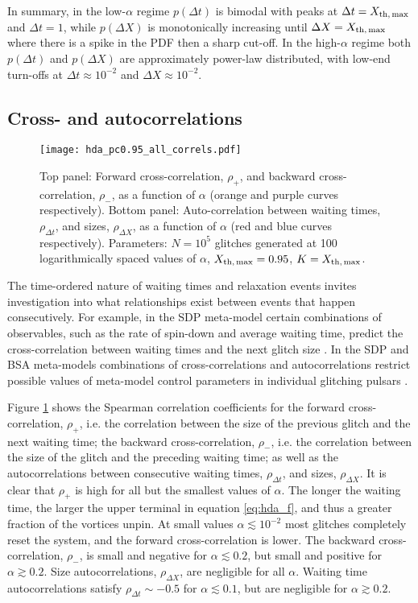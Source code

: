 In summary, in the low-$\alpha$ regime $p(\Delta t)$ is bimodal with peaks at $\Delta t = X_{\rm th,\,max}$ and $\Delta t = 1$, while $p(\Delta X)$ is monotonically increasing until $\Delta X = X_{\rm th,\,max}$ where there is a spike in the PDF then a sharp cut-off. In the high-$\alpha$ regime both $p(\Delta t)$ and $p(\Delta X)$ are approximately power-law distributed, with low-end turn-offs at $\Delta t \approx 10^{-2}$ and $\Delta X \approx 10^{-2}$.

\subsection{Cross- and autocorrelations}
\begin{figure}
\centering
\texttt{[image: hda\_pc0.95\_all\_correls.pdf]}
\caption{Top panel: Forward cross-correlation, $\rho_+$, and backward cross-correlation, $\rho_-$, as a function of $\alpha$ (orange and purple curves respectively). Bottom panel: Auto-correlation between waiting times, $\rho_{\Delta t}$, and sizes, $\rho_{\Delta X}$, as a function of $\alpha$ (red and blue curves respectively). Parameters: $N=10^5$ glitches generated at 100 logarithmically spaced values of $\alpha$, $X_{\rm th,\,max}=0.95$, $K=X_{\rm th,\,max}$. \label{fig:hda_all_correl}}
\end{figure}

The time-ordered nature of waiting times and relaxation events invites investigation into what relationships exist between events that happen consecutively. For example, in the SDP meta-model certain combinations of observables, such as the rate of spin-down and average waiting time, predict the cross-correlation between waiting times and the next glitch size \citep{Melatos2018}. In the SDP and BSA meta-models combinations of cross-correlations and autocorrelations restrict possible values of meta-model control parameters in individual glitching pulsars \citep{Carlin2019ac, Carlin2020bsa}. 

Figure \ref{fig:hda_all_correl} shows the Spearman correlation coefficients for the forward cross-correlation, $\rho_+$, i.e. the correlation between the size of the previous glitch and the next waiting time; the backward cross-correlation, $\rho_-$, i.e. the correlation between the size of the glitch and the preceding waiting time; as well as the autocorrelations between consecutive waiting times, $\rho_{\Delta t}$, and sizes, $\rho_{\Delta X}$. It is clear that $\rho_+$ is high for all but the smallest values of $\alpha$. The longer the waiting time, the larger the upper terminal in equation \eqref{eq:hda_f}, and thus a greater fraction of the vortices unpin. At small values $\alpha \lesssim 10^{-2}$ most glitches completely reset the system, and the forward cross-correlation is lower. The backward cross-correlation, $\rho_-$, is small and negative for $\alpha \lesssim 0.2$, but small and positive for $\alpha \gtrsim 0.2$. Size autocorrelations, $\rho_{\Delta X}$, are negligible for all $\alpha$. Waiting time autocorrelations satisfy $\rho_{\Delta t} \sim -0.5$ for $\alpha \lesssim 0.1$, but are negligible for $\alpha \gtrsim 0.2$.

